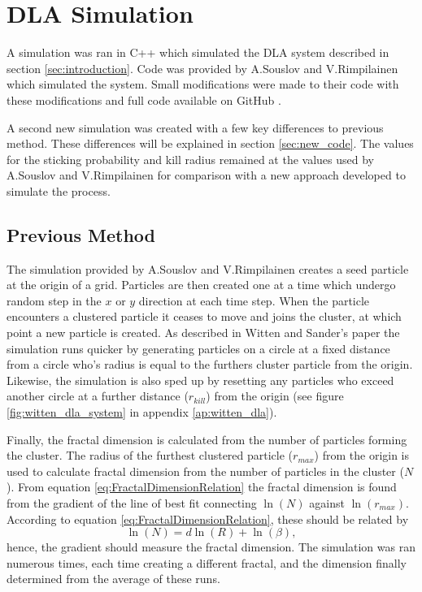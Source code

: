 \documentclass[%
 aapm,
 mph,%
 amsmath,amssymb,
 reprint,%
]{revtex4-2}
\begin{document}
\section{\label{sec:simulation}DLA Simulation}
A simulation was ran in C++ which simulated the DLA system described in section \ref{sec:introduction}. Code was provided by A.Souslov and V.Rimpilainen which simulated the system\cite{CompBCoursework}. Small modifications were made to their code with these modifications and full code available on GitHub
.

A second new simulation was created with a few key differences to previous method. These differences will be explained in section \ref{sec:new_code}. The values for the sticking probability and kill radius remained at the values used by A.Souslov and V.Rimpilainen for comparison with a new approach developed to simulate the process.
\subsection{\label{sec:previous_code}Previous Method}
The simulation provided by A.Souslov and V.Rimpilainen creates a seed particle at the origin of a grid. Particles are then created one at a time which undergo random step in the $x$ or $y$ direction at each time step. When the particle encounters a clustered particle it ceases to move and joins the cluster, at which point a new particle is created. As described in Witten and Sander's paper\cite{WittenDLA} the simulation runs quicker\cite{CompBCoursework} by generating particles on a circle at a fixed distance from a circle who's radius is equal to the furthers cluster particle from the origin. Likewise, the simulation is also sped up by resetting any particles who exceed another circle at a further distance ($r_{kill}$) from the origin (see figure \ref{fig:witten_dla_system} in appendix \ref{ap:witten_dla})\cite{CompBCoursework}.


Finally, the fractal dimension is calculated from the number of particles forming the cluster. The radius of the furthest clustered particle ($r_{max}$) from the origin is used to calculate fractal dimension from the number of particles in the cluster ($N$). From equation \ref{eq:FractalDimensionRelation} the fractal dimension is found from the gradient of the line of best fit connecting $\ln(N)$ against $\ln(r_{max})$. According to equation \ref{eq:FractalDimensionRelation}, these should be related by
\begin{equation}
\ln(N)=d \ln(R) + \ln(\beta),
\end{equation} 
hence, the gradient should measure the fractal dimension. The simulation was ran numerous times, each time creating a different fractal, and the dimension finally determined from the average of these runs.
\end{document}
